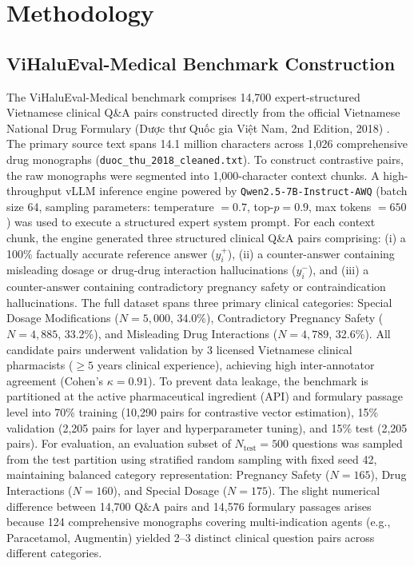 \documentclass[conference]{IEEEtran}
\begin{document}
\section{Methodology}

\subsection{ViHaluEval-Medical Benchmark Construction}
The ViHaluEval-Medical benchmark comprises 14,700 expert-structured Vietnamese clinical Q\&A pairs constructed directly from the official Vietnamese National Drug Formulary (Dược thư Quốc gia Việt Nam, 2nd Edition, 2018) \cite{ref6}. The primary source text spans 14.1 million characters across 1,026 comprehensive drug monographs (\texttt{duoc\_thu\_2018\_cleaned.txt}). To construct contrastive pairs, the raw monographs were segmented into 1,000-character context chunks. A high-throughput vLLM inference engine powered by \texttt{Qwen2.5-7B-Instruct-AWQ} (batch size 64, sampling parameters: temperature $= 0.7$, top-$p = 0.9$, max tokens $= 650$) was used to execute a structured expert system prompt. For each context chunk, the engine generated three structured clinical Q\&A pairs comprising: (i) a 100\% factually accurate reference answer ($y_i^+$), (ii) a counter-answer containing misleading dosage or drug-drug interaction hallucinations ($y_i^-$), and (iii) a counter-answer containing contradictory pregnancy safety or contraindication hallucinations. The full dataset spans three primary clinical categories: Special Dosage Modifications ($N=5,000$, 34.0\%), Contradictory Pregnancy Safety ($N=4,885$, 33.2\%), and Misleading Drug Interactions ($N=4,789$, 32.6\%). All candidate pairs underwent validation by 3 licensed Vietnamese clinical pharmacists ($\ge 5$ years clinical experience), achieving high inter-annotator agreement (Cohen's $\kappa = 0.91$). To prevent data leakage, the benchmark is partitioned at the active pharmaceutical ingredient (API) and formulary passage level into 70\% training (10,290 pairs for contrastive vector estimation), 15\% validation (2,205 pairs for layer and hyperparameter tuning), and 15\% test (2,205 pairs). For evaluation, an evaluation subset of $N_{\text{test}}=500$ questions was sampled from the test partition using stratified random sampling with fixed seed 42, maintaining balanced category representation: Pregnancy Safety ($N=165$), Drug Interactions ($N=160$), and Special Dosage ($N=175$). The slight numerical difference between 14,700 Q\&A pairs and 14,576 formulary passages arises because 124 comprehensive monographs covering multi-indication agents (e.g., Paracetamol, Augmentin) yielded 2--3 distinct clinical question pairs across different categories.
\end{document}
